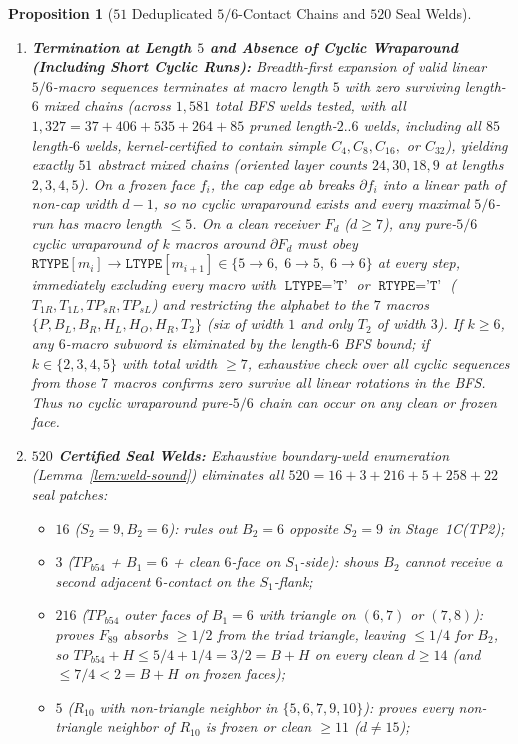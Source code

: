 \documentclass[11pt,reqno]{amsart}
\theoremstyle{plain}
\newtheorem{proposition}[theorem]{Proposition}
\theoremstyle{definition}
\theoremstyle{remark}
\DeclareRobustCommand{\_}{\ifmmode\text{\textunderscore}\else\textunderscore\allowbreak\fi}
\begin{document}
\begin{proposition}[$51$ Deduplicated $5/6$-Contact Chains and $520$ Seal Welds]
\begin{enumerate}[label=(\roman*),leftmargin=2.2em]
  \item \textbf{Termination at Length $5$ and Absence of Cyclic Wraparound (Including Short Cyclic Runs):} Breadth-first expansion of valid linear $5/6$-macro sequences terminates at macro length $5$ with \emph{zero} surviving length-$6$ mixed chains (across $1{,}581$ total BFS welds tested, with all $1{,}327 = 37 + 406 + 535 + 264 + 85$ pruned length-$2..6$ welds, including all $85$ length-$6$ welds, kernel-certified to contain simple $C_4, C_8, C_{16},$ or $C_{32}$), yielding exactly $51$ abstract mixed chains (oriented layer counts $24, 30, 18, 9$ at lengths $2,3,4,5$). On a frozen face $f_i$, the cap edge $ab$ breaks $\partial f_i$ into a linear path of non-cap width $d - 1$, so no cyclic wraparound exists and every maximal $5/6$-run has macro length $\le 5$. On a clean receiver $F_d$ ($d \ge 7$), any pure-$5/6$ cyclic wraparound of $k$ macros around $\partial F_d$ must obey $\texttt{RTYPE}[m_i] \to \texttt{LTYPE}[m_{i+1}] \in \{5 \to 6,\; 6 \to 5,\; 6 \to 6\}$ at every step, immediately excluding every macro with $\texttt{LTYPE}=\texttt{'T'}$ or $\texttt{RTYPE}=\texttt{'T'}$ ($T_{1R}, T_{1L}, TP_{sR}, TP_{sL}$) and restricting the alphabet to the $7$ macros $\{P, B_L, B_R, H_L, H_O, H_R, T_2\}$ (six of width $1$ and only $T_2$ of width $3$). If $k \ge 6$, any $6$-macro subword is eliminated by the length-$6$ BFS bound; if $k \in \{2, 3, 4, 5\}$ with total width $\ge 7$, exhaustive check over all cyclic sequences from those $7$ macros confirms \emph{zero} survive all linear rotations in the BFS. Thus no cyclic wraparound pure-$5/6$ chain can occur on any clean or frozen face.
  \item \textbf{$520$ Certified Seal Welds:} Exhaustive boundary-weld enumeration (Lemma~\ref{lem:weld-sound}) eliminates all $520 = 16 + 3 + 216 + 5 + 258 + 22$ seal patches:
  \begin{itemize}[leftmargin=1.5em]
    \item $16$ ($S_2 = 9, B_2 = 6$): rules out $B_2 = 6$ opposite $S_2 = 9$ in Stage~1C(TP2);
    \item $3$ ($TP_{b54}$ + $B_1 = 6$ + clean $6$-face on $S_1$-side): shows $B_2$ cannot receive a second adjacent $6$-contact on the $S_1$-flank;
    \item $216$ ($TP_{b54}$ outer faces of $B_1=6$ with triangle on $(6,7)$ or $(7,8)$): proves $F_{89}$ absorbs $\ge 1/2$ from the triad triangle, leaving $\le 1/4$ for $B_2$, so $TP_{b54} + H \le 5/4 + 1/4 = 3/2 = B + H$ on every clean $d \ge 14$ (and $\le 7/4 < 2 = B + H$ on frozen faces);
    \item $5$ ($R_{10}$ with non-triangle neighbor in $\{5,6,7,9,10\}$): proves every non-triangle neighbor of $R_{10}$ is frozen or clean $\ge 11$ ($d \neq 15$);

\end{itemize}
\end{enumerate}
\end{proposition}
\end{document}
